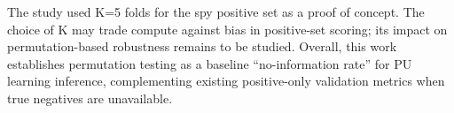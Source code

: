 \documentclass[11pt]{article}
\begin{document}
The study used K=5 folds for the spy positive set as a proof of concept. The choice of K may trade compute against bias in positive-set scoring; its impact on permutation-based robustness remains to be studied. Overall, this work establishes permutation testing as a baseline ``no-information rate'' for PU learning inference, complementing existing positive-only validation metrics when true negatives are unavailable.



\end{document}
